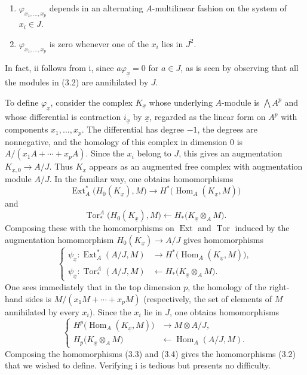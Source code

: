 \begin{enumerate}
\item[\textup{i.}] $\varphi_{x_1,\ldots,x_p}$ depends in an alternating
$A$-multilinear fashion on the system of $x_i\in J$.
\item[\textup{ii.}] $\varphi_{x_1,\ldots,x_p}$ is zero whenever one of the
$x_i$ lies in $J^{2}$.
\end{enumerate}
In fact, ii follows from i, since $a\varphi_{\underline{x}}=0$ for $a\in J$, as
is seen by observing that all the modules in (3.2) are annihilated by $J$.

To define $\varphi_{\underline{x}}$, consider the complex
$K_{\underline{x}}$ whose underlying $A$-module is $\bigwedge A^{p}$ and whose
differential is contraction $i_{\underline{x}}$ by $\underline{x}$, regarded
as the linear form on $A^{p}$ with components $x_1,\ldots,x_p$. The differential
has degree $-1$, the degrees are nonnegative, and the homology of this complex
in dimension $0$ is $A/(x_1A+\cdots+x_pA)$. Since the $x_i$ belong to $J$, this
gives an augmentation $K_{\underline{x},0}\longrightarrow A/J$. Thus
$K_{\underline{x}}$ appears as an augmented free complex with augmentation
module $A/J$. In the familiar way, one obtains homomorphisms
\[
\operatorname{Ext}_{A}^{*}\bigl(H_0(K_{\underline{x}}),M\bigr)
\longrightarrow
H^{*}\bigl(\operatorname{Hom}_{A}(K_{\underline{x}},M)\bigr)
\]
and
\[
\operatorname{Tor}_{*}^{A}\bigl(H_0(K_{\underline{x}}),M\bigr)
\longleftarrow
H_{*}\bigl(K_{\underline{x}}\otimes_A M\bigr).
\]
Composing these with the homomorphisms on $\operatorname{Ext}$ and
$\operatorname{Tor}$ induced by the augmentation homomorphism
$H_0(K_{\underline{x}})\longrightarrow A/J$ gives homomorphisms
\begin{equation}\tag{3.3}
\left\{
\begin{aligned}
\psi_{\underline{x}}:
\operatorname{Ext}_{A}^{*}(A/J,M)
&\longrightarrow H^{*}\bigl(\operatorname{Hom}_{A}(K_{\underline{x}},M)\bigr),\\
\psi_{\underline{x}}:
\operatorname{Tor}_{*}^{A}(A/J,M)
&\longleftarrow H_{*}\bigl(K_{\underline{x}}\otimes_A M\bigr).
\end{aligned}
\right.
\end{equation}
One sees immediately that in the top dimension $p$, the homology of the
right-hand sides is $M/(x_1M+\cdots+x_pM)$ (respectively, the set of elements of
$M$ annihilated by every $x_i$). Since the $x_i$ lie in $J$, one obtains
homomorphisms
\begin{equation}\tag{3.4}
\left\{
\begin{aligned}
H^{p}\bigl(\operatorname{Hom}_{A}(K_{\underline{x}},M)\bigr)
&\longrightarrow M\otimes A/J,\\
H_{p}\bigl(K_{\underline{x}}\otimes_A M\bigr)
&\longleftarrow\operatorname{Hom}_{A}(A/J,M).
\end{aligned}
\right.
\end{equation}
Composing the homomorphisms (3.3) and (3.4) gives the homomorphisms (3.2) that we
wished to define. Verifying i is tedious but presents no difficulty.


